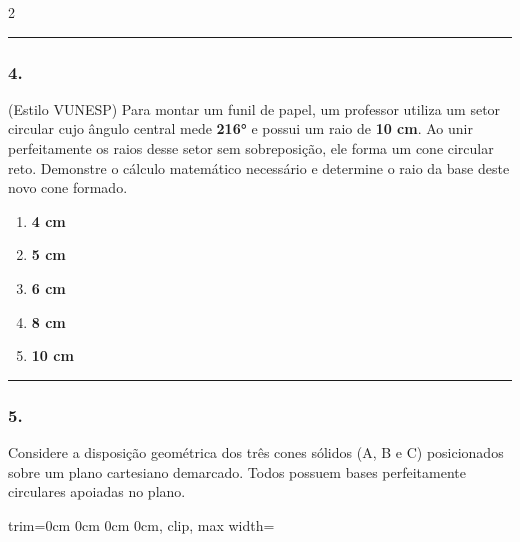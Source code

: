 \documentclass[twoside, 10pt, a4paper]{article}
\newlength{\espacoPreQuestao}\setlength{\espacoPreQuestao}{0.1cm}
\newlength{\espacoQuestao}\setlength{\espacoQuestao}{0.2cm}
\newlength{\espacoAlt}\setlength{\espacoAlt}{0.2cm}
\begin{document}
\begin{multicols*}{2}
\noindent\textcolor{CorLinha}{\rule{\linewidth}{0.5pt}} 
\par\vspace{\espacoPreQuestao}
\subsubsection*{4.} (Estilo VUNESP) Para montar um funil de papel, um professor utiliza um setor circular cujo ângulo central mede \textbf{216°} e possui um raio de \textbf{10 cm}. Ao unir perfeitamente os raios desse setor sem sobreposição, ele forma um cone circular reto. Demonstre o cálculo matemático necessário e determine o raio da base deste novo cone formado.

\begin{enumerate}[label=\alph*), itemsep=\espacoAlt]
\item \textbf{4 cm}
\item \textbf{5 cm}
\item \textbf{6 cm}
\item \textbf{8 cm}
\item \textbf{10 cm}
\end{enumerate}
\par\vspace{\espacoQuestao}

\noindent\textcolor{CorLinha}{\rule{\linewidth}{0.5pt}} 
\par\vspace{\espacoPreQuestao}
\subsubsection*{5.} Considere a disposição geométrica dos três cones sólidos (A, B e C) posicionados sobre um plano cartesiano demarcado. Todos possuem bases perfeitamente circulares apoiadas no plano.

\begin{center}
\begin{adjustbox}{trim=0cm 0cm 0cm 0cm, clip, max width=\linewidth}
\end{adjustbox}
\end{center}
\end{multicols*}
\end{document}
